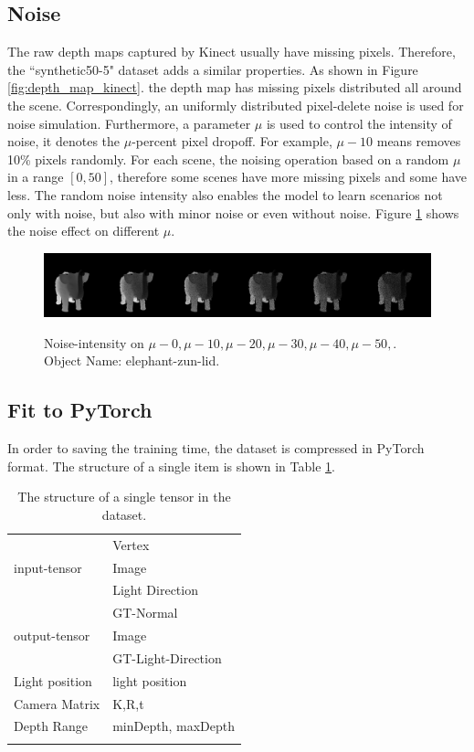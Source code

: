 \subsection{Noise}
\label{sec:noise}
The raw depth maps captured by Kinect usually have missing pixels. Therefore, the ``synthetic50-5" dataset adds a similar properties.
As shown in Figure \ref{fig:depth_map_kinect}. the depth map has missing pixels distributed all around the scene.  Correspondingly, an uniformly distributed pixel-delete noise is used for noise simulation. 
Furthermore, a parameter $ \mu $ is used to control the intensity of noise, it denotes the $ \mu $-percent pixel dropoff. For example, $ \mu-10 $ means removes 10\% pixels randomly. For each scene, the noising operation based on a random $ \mu $ in a range $ \left[0, 50\right] $, therefore some scenes have more missing pixels and some have less. The random noise intensity also enables the model to learn scenarios not only with noise, but also with minor noise or even without noise.
Figure \ref{fig:noise-intensity} shows the noise effect on different $ \mu $.
\begin{figure}[!h]
	\centering
	{\includegraphics[width=.9\textwidth]{./Figures/add_noise_depth.png}}
	\decoRule	
	\caption{Noise-intensity on $ \mu-0, \mu-10,\mu-20, \mu-30, \mu-40, \mu-50,$. Object Name: elephant-zun-lid.}
	\label{fig:noise-intensity}
\end{figure}


\subsection{Fit to PyTorch}
In order to saving the training time, the dataset is compressed in PyTorch format. The structure of a single item is shown in Table \ref{tab:tensor-structure}.
\begin{table}
	\caption{The structure of a single tensor in the dataset.}
	\label{tab:tensor-structure}
	\centering
	\begin{tabular}{l l}
		\toprule
		\tabhead{Name} & \tabhead{Content} \\
		\midrule
		\multirow{3}{*}{input-tensor}  & Vertex \\  & Image \\  & Light Direction \\
		\hline
		\multirow{3}{*}{output-tensor}  & GT-Normal \\ & Image \\ & GT-Light-Direction \\
		\hline
		Light position & light position \\
		\hline 
		Camera Matrix  & K,R,t\\
		\hline 
		Depth Range  & minDepth, maxDepth\\
		\bottomrule\\
	\end{tabular}
\end{table}